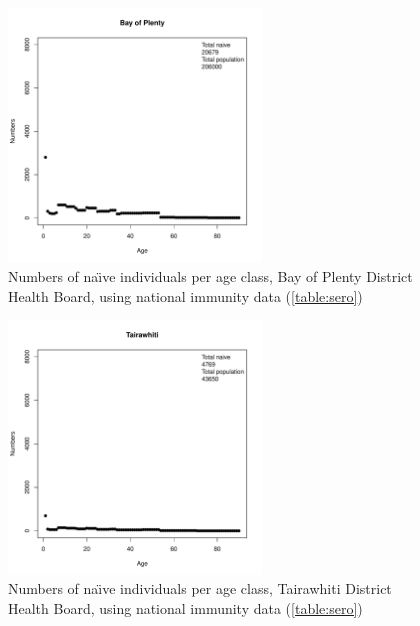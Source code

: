\documentclass{article}
\begin{document}
\begin{figure}[H]
     \begin{center}
     \includegraphics[width=0.6\textwidth]{dhb7.pdf}
     \end{center}
     \caption{Numbers of na\"{\i}ve individuals per age class, Bay of Plenty District Health Board, using national immunity data (\autoref{table:sero})}
     \label{fig:BayofPlenty}
\end{figure}

\begin{figure}[H]
     \begin{center}
     \includegraphics[width=0.6\textwidth]{dhb8.pdf}
     \end{center}
     \caption{Numbers of na\"{\i}ve individuals per age class, Tairawhiti District Health Board, using national immunity data (\autoref{table:sero})}
     \label{fig:Tairawhiti}
\end{figure}
\end{document}
